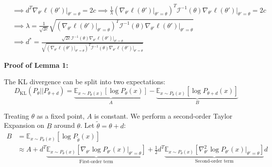 \begin{solution}
\begin{itemize}
              \begin{align*}
                   & \implies d^T \nabla_{\theta'} \ell(\theta') \Big|_{\theta'=\theta} = 2c \implies \frac{1}{\lambda} \left( \nabla_{\theta'} \ell(\theta') \Big|_{\theta'=\theta} \right)^T \mathcal{I}^{-1}(\theta) \nabla_{\theta'} \ell(\theta') \Big|_{\theta'=\theta} = 2c                \\
                   & \implies \lambda = \frac{1}{\sqrt{2c}} \sqrt{\left( \nabla_{\theta'} \ell(\theta') \Big|_{\theta'=\theta} \right)^T \mathcal{I}^{-1}(\theta) \nabla_{\theta'} \ell(\theta') \Big|_{\theta'=\theta}}                                                                          \\
                   & \implies d^* = \frac{\sqrt{2c} \mathcal{I}^{-1}(\theta) \nabla_{\theta'} \ell(\theta') \Big|_{\theta'=\theta}}{\sqrt{\left( \nabla_{\theta'} \ell(\theta') \Big|_{\theta'=\theta} \right)^T \mathcal{I}^{-1}(\theta) \nabla_{\theta'} \ell(\theta') \Big|_{\theta'=\theta}}}
              \end{align*}

              \textbf{Proof of Lemma 1:}

              The KL divergence can be split into two expectations:
              \[
                  D_{\text{KL}}(P_\theta || P_{\theta+d}) = \underbrace{\mathbb{E}_{x \sim P_\theta(x)} [\log P_\theta(x)]}_{A} - \underbrace{\mathbb{E}_{x \sim P_\theta(x)} [\log P_{\theta+d}(x)]}_{B}
              \]

              Treating $\theta$ as a fixed point, $A$ is constant. We perform a second-order Taylor Expansion on $B$ around $\theta$. Let $\tilde{\theta} = \theta + d$:
              \begin{align*}
                  B & = \mathbb{E}_{x \sim P_\theta(x)} [\log P_{\tilde{\theta}}(x)]                                                                                                                                                                                                                                                                             \\
                    & \approx A + d^T \underbrace{\mathbb{E}_{x \sim P_\theta(x)} \left[ \nabla_{\theta'} \log P_{\theta'}(x) \Big|_{\theta'=\theta} \right]}_{\text{First-order term}} + \frac{1}{2} d^T \underbrace{\mathbb{E}_{x \sim P_\theta(x)} \left[ \nabla_{\theta'}^2 \log P_{\theta'}(x) \Big|_{\theta'=\theta} \right]}_{\text{Second-order term}} d
              \end{align*}


\end{itemize}
\end{solution}
